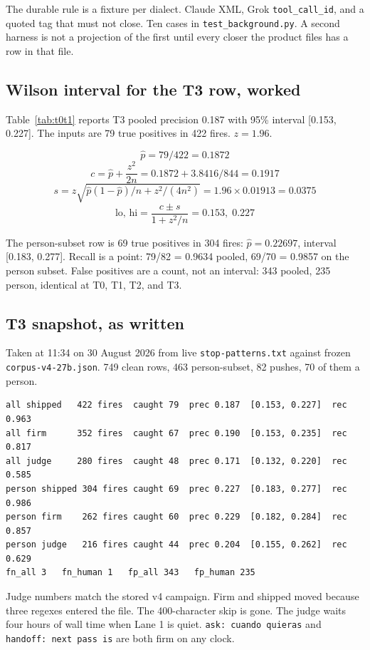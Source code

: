The durable rule is a fixture per dialect. Claude XML, Grok
\texttt{tool\_call\_id}, and a quoted tag that must not close. Ten
cases in \texttt{test\_background.py}. A second harness is not a
projection of the first until every closer the product files has a
row in that file.

\subsection{Wilson interval for the T3 row, worked}
\label{app:wilson}

Table~\ref{tab:t0t1} reports T3 pooled precision 0.187 with 95\%
interval [0.153, 0.227]. The inputs are 79 true positives in 422
fires. $z=1.96$.

\[
\hat p = 79/422 = 0.1872
\]
\[
c = \hat p + \frac{z^2}{2n} = 0.1872 + 3.8416/844 = 0.1917
\]
\[
s = z\sqrt{\hat p(1-\hat p)/n + z^2/(4n^2)} = 1.96 \times 0.01913 = 0.0375
\]
\[
\mathrm{lo},\,\mathrm{hi} = \frac{c \pm s}{1 + z^2/n} = 0.153,\; 0.227
\]

The person-subset row is 69 true positives in 304 fires: $\hat p =
0.22697$, interval [0.183, 0.277]. Recall is a point: 79/82 =
0.9634 pooled, 69/70 = 0.9857 on the person subset. False positives
are a count, not an interval: 343 pooled, 235 person, identical at
T0, T1, T2, and T3.

\subsection{T3 snapshot, as written}
\label{app:t3snap}

Taken at 11:34 on 30 August 2026 from live \texttt{stop-patterns.txt}
against frozen \texttt{corpus-v4-27b.json}. 749 clean rows, 463
person-subset, 82 pushes, 70 of them a person.

\begin{verbatim}
all shipped   422 fires  caught 79  prec 0.187  [0.153, 0.227]  rec 0.963
all firm      352 fires  caught 67  prec 0.190  [0.153, 0.235]  rec 0.817
all judge     280 fires  caught 48  prec 0.171  [0.132, 0.220]  rec 0.585
person shipped 304 fires caught 69  prec 0.227  [0.183, 0.277]  rec 0.986
person firm    262 fires caught 60  prec 0.229  [0.182, 0.284]  rec 0.857
person judge   216 fires caught 44  prec 0.204  [0.155, 0.262]  rec 0.629
fn_all 3   fn_human 1   fp_all 343   fp_human 235
\end{verbatim}

Judge numbers match the stored v4 campaign. Firm and shipped moved
because three regexes entered the file. The 400-character skip is
gone. The judge waits four hours of wall time when Lane 1 is quiet.
\texttt{ask: cuando quieras} and \texttt{handoff: next pass is}
are both firm on any clock.

